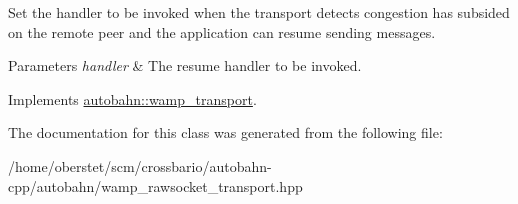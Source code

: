 Set the handler to be invoked when the transport detects congestion has subsided on the remote peer and the application can resume sending messages. 


\begin{DoxyParams}{Parameters}
{\em handler} & The resume handler to be invoked. \\
\hline
\end{DoxyParams}


Implements \hyperlink{classautobahn_1_1wamp__transport_a96ed112feb74285454180113211ce8af}{autobahn\+::wamp\+\_\+transport}.



The documentation for this class was generated from the following file\+:\begin{DoxyCompactItemize}
\item 
/home/oberstet/scm/crossbario/autobahn-\/cpp/autobahn/wamp\+\_\+rawsocket\+\_\+transport.\+hpp\end{DoxyCompactItemize}
